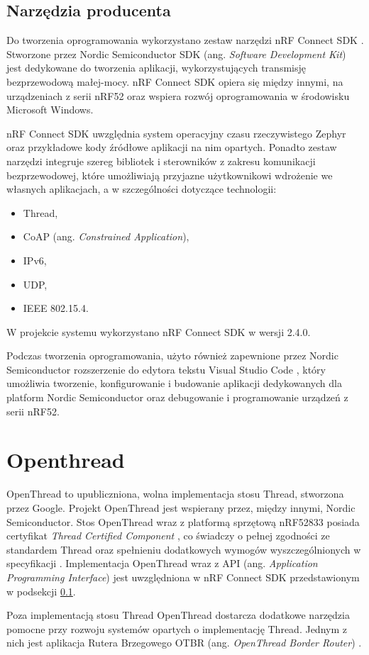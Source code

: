 \subsection{Narzędzia producenta}
\label{subsec:producer-tools}

    Do tworzenia oprogramowania wykorzystano zestaw narzędzi nRF Connect SDK \cite{nrf-connect}. Stworzone przez Nordic Semiconductor SDK (ang. \textit{Software Development Kit}) jest dedykowane do tworzenia aplikacji, wykorzystujących transmisję bezprzewodową małej-mocy. nRF Connect SDK opiera się między innymi, na urządzeniach z serii nRF52 oraz wspiera rozwój oprogramowania w środowisku Microsoft Windows.

    nRF Connect SDK uwzględnia system operacyjny czasu rzeczywistego Zephyr oraz przykładowe kody źródłowe aplikacji na nim opartych. Ponadto zestaw narzędzi integruje szereg bibliotek i sterowników z zakresu komunikacji bezprzewodowej, które umożliwiają przyjazne użytkownikowi wdrożenie we własnych aplikacjach, a w szczególności dotyczące technologii:
    \begin{itemize}
        \item Thread,
        \item CoAP (ang. \textit{Constrained Application}),
        \item IPv6,
        \item UDP,
        \item IEEE 802.15.4.
    \end{itemize}

    W projekcie systemu wykorzystano nRF Connect SDK w wersji 2.4.0.

    Podczas tworzenia oprogramowania, użyto również zapewnione przez Nordic Semiconductor rozszerzenie do edytora tekstu Visual Studio Code \cite{nrf-ide}, który umożliwia tworzenie, konfigurowanie i budowanie aplikacji dedykowanych dla platform Nordic Semiconductor oraz debugowanie i programowanie urządzeń z serii nRF52. 

\section{Openthread}

    OpenThread to upubliczniona, wolna implementacja stosu Thread, stworzona przez Google. Projekt OpenThread jest wspierany przez, między innymi, Nordic Semiconductor. Stos OpenThread wraz z platformą sprzętową nRF52833 posiada certyfikat \textit{Thread Certified Component} \cite{nrf52833-tcc}, co świadczy o pełnej zgodności ze standardem Thread oraz spełnieniu dodatkowych wymogów wyszczególnionych w specyfikacji \cite{thread-1.3.0}. Implementacja OpenThread wraz z API (ang. \textit{Application Programming Interface}) jest uwzględniona w nRF Connect SDK przedstawionym w podsekcji \ref{subsec:producer-tools}.

    Poza implementacją stosu Thread OpenThread dostarcza dodatkowe narzędzia pomocne przy rozwoju systemów opartych o implementację Thread. Jednym z nich jest aplikacja Rutera Brzegowego OTBR (ang. \textit{OpenThread Border Router}) \cite{openthread-br}.